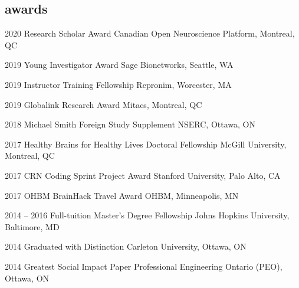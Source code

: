 \documentclass[]{friggeri-cv} %
\begin{document}
\subsection{awards}
\begin{entrylist}
\vspace{-7pt}

\entry
{2020}
{Research Scholar Award}
{Canadian Open Neuroscience Platform, Montreal, QC}
{}
\vspace{-7pt}

\entry
{2019}
{Young Investigator Award}
{Sage Bionetworks, Seattle, WA}
{}
\vspace{-7pt}

\entry
{2019}
{Instructor Training Fellowship}
{Repronim, Worcester, MA}
{}
\vspace{-7pt}

\entry
{2019}
{Globalink Research Award}
{Mitacs, Montreal, QC}
{}
\vspace{-7pt}

\entry
{2018}
{Michael Smith Foreign Study Supplement}
{NSERC, Ottawa, ON}
{}
\vspace{-7pt}

\entry
{2017}
{Healthy Brains for Healthy Lives Doctoral Fellowship}
{McGill University, Montreal, QC}
{}
\vspace{-7pt}

\entry
{2017}
{CRN Coding Sprint Project Award}
{Stanford University, Palo Alto, CA}
{}
\vspace{-7pt}

\entry
{2017}
{OHBM BrainHack Travel Award}
{OHBM, Minneapolis, MN}
{}
\vspace{-7pt}

\entry
{2014 -- 2016}
{Full-tuition Master's Degree Fellowship}
{Johns Hopkins University, Baltimore, MD}
{}
\vspace{-7pt}

\entry
{2014}
{Graduated with Distinction}
{Carleton University, Ottawa, ON}
{}
\vspace{-7pt}

\entry
{2014}
{Greatest Social Impact Paper}
{Professional Engineering Ontario (PEO), Ottawa, ON}
{}
\vspace{-7pt}


\end{entrylist}
\end{document}
